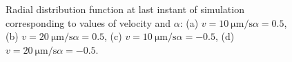\documentclass[../../master_thesis_np.tex]{subfiles}
\begin{document}
		\begin{figure}[htp]
			\centering\
			\\
			\\
			
			\caption{Radial distribution function at last instant of simulation corresponding to values of velocity and $\alpha$: (a) $v = \SI{10}{\um \per \second} \alpha = 0.5$, (b) $v = \SI{20}{\um \per \second} \alpha = 0.5$, (c) $v = \SI{10}{\um \per \second} \alpha = -0.5$, (d) $v = \SI{20}{\um \per \second} \alpha = -0.5$.}
			\label{fig:lj_velocity_rdf}
		\end{figure}
\end{document}
